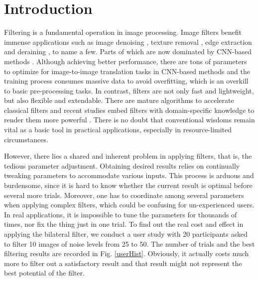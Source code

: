 \documentclass[twocolumn]{svjour3}          %
\begin{document}
\section{Introduction} \label{sec1}
Filtering is a fundamental operation in image processing. Image filters benefit immense applications such as image denoising \cite{fil_denoise,fil_denoise2}, texture removal \cite{Cho2013_BTF,RGF}, edge extraction \cite{fil_edge1,fil_edge2,fil_edge3} and deraining \cite{Xu2012a_derain,Zheng2013_derain}, to name a few. Parts of which are now dominated by CNN-based methods \cite{DLdenoise1,DLdenoise2,DLderain1,DLSmooth,DLderain2,ijcai/DengFW0C0Z021,corr/abs-2112-06451}. Although achieving better performance, there are tons of parameters to optimize for image-to-image translation tasks in CNN-based methods and the training process consumes massive data to avoid overfitting, which is an overkill to basic pre-processing tasks. In contrast, filters are not only fast and lightweight, but also flexible and extendable. There are mature algorithms \cite{BF_ac1,ac2,guidedfil_ac} to accelerate classical filters and recent studies embed filters with domain-specific knowledge to render them more powerful \cite{Cho2013_BTF,Jeon2016}. There is no doubt that conventional wisdoms remain vital as a basic tool in practical applications, especially in resource-limited circumstances.

However, there lies a shared and inherent problem in applying filters, that is, the tedious parameter adjustment. Obtaining desired results relies on continually tweaking parameters to accommodate various inputs. This process is arduous and burdensome, since it is hard to know whether the current result is optimal before several more trials. Moreover, one has to coordinate among several parameters when applying complex filters, which could be confusing for un-experienced users. 
In real applications, it is impossible to tune the parameters for thousands of times, nor fix the thing just in one trial. To find out the real cost and effect in applying the bilateral filter, we conduct a user study with 20 participants asked to filter 10 images of noise levels from 25 to 50. The number of trials and the best filtering results are recorded in Fig. \ref{userHist}. Obviously, it actually costs much more to filter out a satisfactory result and that result might not represent the best potential of the filter.
\end{document}
